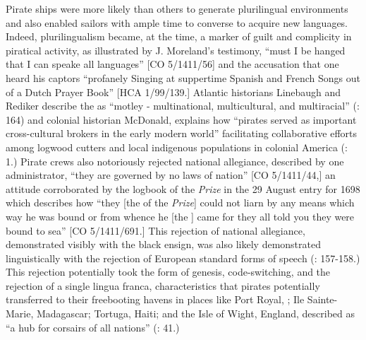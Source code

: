 Pirate ships were more likely than others to generate plurilingual environments and also enabled sailors with ample time to converse to acquire new languages. Indeed, plurilingualism became, at the time, a marker of guilt and complicity in piratical activity, as illustrated by J. Moreland’s testimony, “must I be hanged that I can speake all languages” [CO 5/1411/56] and the accusation that one  heard his captors “profanely Singing at suppertime Spanish and French Songs out of a Dutch Prayer Book” [HCA 1/99/139.] Atlantic historians Linebaugh and Rediker describe the  as “motley - multinational, multicultural, and multiracial” (\citeyear*{LinebaughRediker2000}: 164) and colonial historian McDonald, explains how “pirates served as important cross-cultural brokers in the early modern world” facilitating collaborative efforts among logwood cutters and local indigenous populations in colonial America (\citeyear*{McDonald2016}: 1.)  Pirate crews also notoriously rejected national allegiance, described by one administrator, “they are governed by no laws of nation” [CO 5/1411/44,] an attitude corroborated by the logbook of the \textit{ Prize} in the 29 August entry for 1698 which describes how “they [the  of the \textit{ Prize}] could not liarn by any means which way he was bound or from whence he [the ] came for they all told you they were bound to sea” [CO 5/1411/691.] This rejection of national allegiance, demonstrated visibly with the black ensign, was also likely demonstrated linguistically with the rejection of European standard forms of speech (\citealt{Delgado2013}: 157-158.) This rejection potentially took the form of  genesis, code-switching, and the rejection of a single lingua franca, characteristics that pirates potentially transferred to their freebooting havens in places like Port Royal, ; Ile Sainte-Marie, Madagascar; Tortuga, Haiti; and the Isle of Wight, England, described as “a hub for corsairs of all nations” (\citealt{Bicheno2012}: 41.) 

